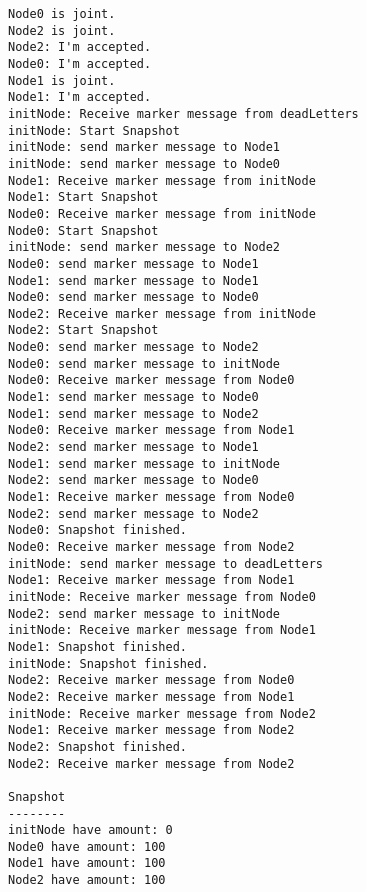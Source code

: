 \begin{lstlisting}[caption={Beispiel Ablauf des Snapshot Algorithmus mit 3 Knoten neben dem initKnoten}, label=lst:testss]
Node0 is joint.
Node2 is joint.
Node2: I'm accepted.
Node0: I'm accepted.
Node1 is joint.
Node1: I'm accepted.
initNode: Receive marker message from deadLetters
initNode: Start Snapshot
initNode: send marker message to Node1
initNode: send marker message to Node0
Node1: Receive marker message from initNode
Node1: Start Snapshot
Node0: Receive marker message from initNode
Node0: Start Snapshot
initNode: send marker message to Node2
Node0: send marker message to Node1
Node1: send marker message to Node1
Node0: send marker message to Node0
Node2: Receive marker message from initNode
Node2: Start Snapshot
Node0: send marker message to Node2
Node0: send marker message to initNode
Node0: Receive marker message from Node0
Node1: send marker message to Node0
Node1: send marker message to Node2
Node0: Receive marker message from Node1
Node2: send marker message to Node1
Node1: send marker message to initNode
Node2: send marker message to Node0
Node1: Receive marker message from Node0
Node2: send marker message to Node2
Node0: Snapshot finished.
Node0: Receive marker message from Node2
initNode: send marker message to deadLetters
Node1: Receive marker message from Node1
initNode: Receive marker message from Node0
Node2: send marker message to initNode
initNode: Receive marker message from Node1
Node1: Snapshot finished.
initNode: Snapshot finished.
Node2: Receive marker message from Node0
Node2: Receive marker message from Node1
initNode: Receive marker message from Node2
Node1: Receive marker message from Node2
Node2: Snapshot finished.
Node2: Receive marker message from Node2

Snapshot
--------
initNode have amount: 0
Node0 have amount: 100
Node1 have amount: 100
Node2 have amount: 100
\end{lstlisting}